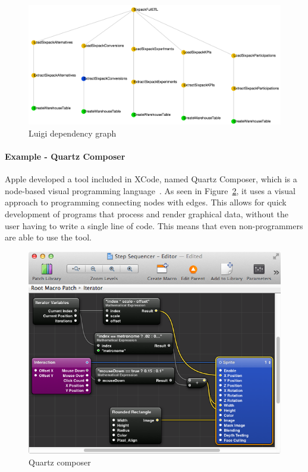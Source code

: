\documentclass[dissertation.tex]{subfiles}
\begin{document}
\begin{figure}[ht]
  \centering
  \includegraphics[scale=0.4]{diagrams/luigi-example.png}
  \caption{Luigi dependency graph~\cite{hu_2015}}
  \label{fig:luigi-example}
\end{figure}



\paragraph{Example - Quartz Composer}
Apple developed a tool included in XCode, named Quartz Composer, which is a node-based visual programming language~\cite{quartz}.
As seen in Figure~\ref{fig:quartz-composer}, it uses a visual approach to programming connecting nodes with edges.
This allows for quick development of programs that process and render graphical data, without the user having to write a single line of code.
This means that even non-programmers are able to use the tool.

\begin{figure}[ht]
  \centering
  \includegraphics[scale=0.3]{diagrams/quartz_composer.png}
  \caption{Quartz composer~\cite{costello_2012}}
  \label{fig:quartz-composer}
\end{figure}
\end{document}
